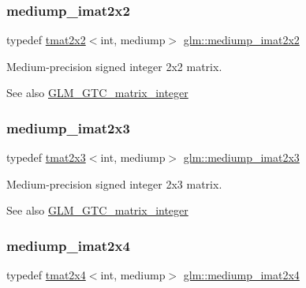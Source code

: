 \subsubsection{\texorpdfstring{mediump\+\_\+imat2x2}{mediump\_imat2x2}}
{\footnotesize\ttfamily typedef \hyperlink{structglm_1_1tmat2x2}{tmat2x2}$<$int, mediump$>$ \hyperlink{group__gtc__matrix__integer_ga52a40f2f95562746fd8084726a300963}{glm\+::mediump\+\_\+imat2x2}}

Medium-\/precision signed integer 2x2 matrix. \begin{DoxySeeAlso}{See also}
\hyperlink{group__gtc__matrix__integer}{G\+L\+M\+\_\+\+G\+T\+C\+\_\+matrix\+\_\+integer} 
\end{DoxySeeAlso}
\mbox{\label{group__gtc__matrix__integer_ga07314e9f05b82367570ca44c3ef7c0a7}} 
\subsubsection{\texorpdfstring{mediump\+\_\+imat2x3}{mediump\_imat2x3}}
{\footnotesize\ttfamily typedef \hyperlink{structglm_1_1tmat2x3}{tmat2x3}$<$int, mediump$>$ \hyperlink{group__gtc__matrix__integer_ga07314e9f05b82367570ca44c3ef7c0a7}{glm\+::mediump\+\_\+imat2x3}}

Medium-\/precision signed integer 2x3 matrix. \begin{DoxySeeAlso}{See also}
\hyperlink{group__gtc__matrix__integer}{G\+L\+M\+\_\+\+G\+T\+C\+\_\+matrix\+\_\+integer} 
\end{DoxySeeAlso}
\mbox{\label{group__gtc__matrix__integer_ga944a139f15de6bc12e9c7bf615ffc4f5}} 
\subsubsection{\texorpdfstring{mediump\+\_\+imat2x4}{mediump\_imat2x4}}
{\footnotesize\ttfamily typedef \hyperlink{structglm_1_1tmat2x4}{tmat2x4}$<$int, mediump$>$ \hyperlink{group__gtc__matrix__integer_ga944a139f15de6bc12e9c7bf615ffc4f5}{glm\+::mediump\+\_\+imat2x4}}

